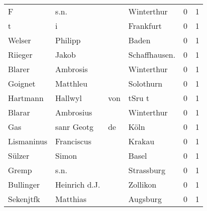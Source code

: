 \documentclass[10pt,a4paper,landscape]{article}
\begin{document}
\begin{longtable}{llllrr}
                        F &                               s.n. &             &                                  Winterthur &          0 &         1 \\
                        t &                                  i &             &                                   Frankfurt &          0 &         1 \\
                   Welser &                            Philipp &             &                                       Baden &          0 &         1 \\
                  Riieger &                              Jakob &             &                              Schaffhausen.  &          0 &         1 \\
                   Blarer &                           Ambrosis &             &                                  Winterthur &          0 &         1 \\
                  Goignet &                           Matthleu &             &                                   Solothurn &          0 &         1 \\
                 Hartmann &                            Hallwyl &         von &                                      tSru t &          0 &         1 \\
                   Blarar &                          Ambrosius &             &                                  Winterthur &          0 &         1 \\
                      Gas &                         sanr Geotg &          de &                                        Köln &          0 &         1 \\
               Lismaninus &                         Franciscus &             &                                      Krakau &          0 &         1 \\
                   Sülzer &                              Simon &             &                                       Basel &          0 &         1 \\
                    Gremp &                               s.n. &             &                                  Strassburg &          0 &         1 \\
                Bullinger &                      Heinrich d.J. &             &                                    Zollikon &          0 &         1 \\
                Sekenjtfk &                           Matthias &             &                                    Augsburg &          0 &         1 \\

\end{longtable}
\end{document}
